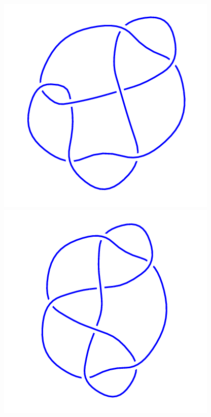 \begin{figure}[H]
\begin{minipage}[b]{.18\linewidth}
    \end{minipage}
    \begin{minipage}[b]{.18\linewidth}
        \centering
        \includegraphics[width=\linewidth]{../data/7_6.png}
    \end{minipage}
    \begin{minipage}[b]{.18\linewidth}
        \centering
        \includegraphics[width=\linewidth]{../data/7_7.png}

\end{minipage}
\end{figure}
